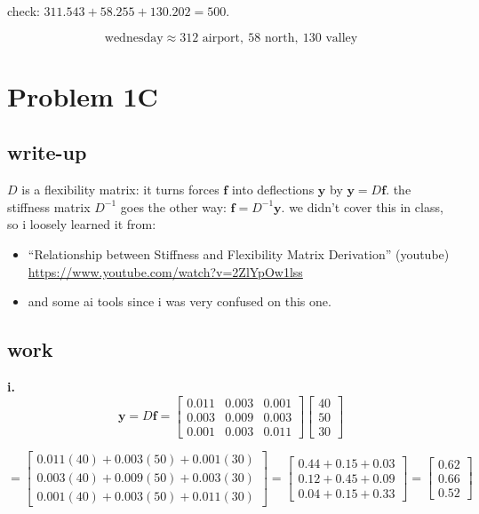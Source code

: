 \documentclass{article}
\begin{document}
check: $311.543 + 58.255 + 130.202 = 500$. \checkmark

\[
\boxed{
\text{wednesday} \approx 312 \text{ airport},\ 58 \text{ north},\ 130 \text{ valley}
}
\]

\section*{Problem 1C}

\subsection*{write-up}

$D$ is a flexibility matrix: it turns forces $\mathbf{f}$ into deflections $\mathbf{y}$ by $\mathbf{y} = D\mathbf{f}$.
the stiffness matrix $D^{-1}$ goes the other way: $\mathbf{f} = D^{-1}\mathbf{y}$.
we didn't cover this in class, so i loosely learned it from:

\begin{itemize}
  \item ``Relationship between Stiffness and Flexibility Matrix Derivation'' (youtube) \\
        \url{https://www.youtube.com/watch?v=2ZlYpOw1lss}
  \item and some ai tools since i was very confused on this one. \\
\end{itemize}

\subsection*{work}

\textbf{i.}
\[
\mathbf{y} = D\mathbf{f} =
\begin{bmatrix}
0.011 & 0.003 & 0.001 \\
0.003 & 0.009 & 0.003 \\
0.001 & 0.003 & 0.011
\end{bmatrix}
\begin{bmatrix}
40 \\ 50 \\ 30
\end{bmatrix}
\]

\[
=
\begin{bmatrix}
0.011(40) + 0.003(50) + 0.001(30) \\
0.003(40) + 0.009(50) + 0.003(30) \\
0.001(40) + 0.003(50) + 0.011(30)
\end{bmatrix}
=
\begin{bmatrix}
0.44 + 0.15 + 0.03 \\
0.12 + 0.45 + 0.09 \\
0.04 + 0.15 + 0.33
\end{bmatrix}
=
\begin{bmatrix}
0.62 \\ 0.66 \\ 0.52
\end{bmatrix}
\]
\end{document}

